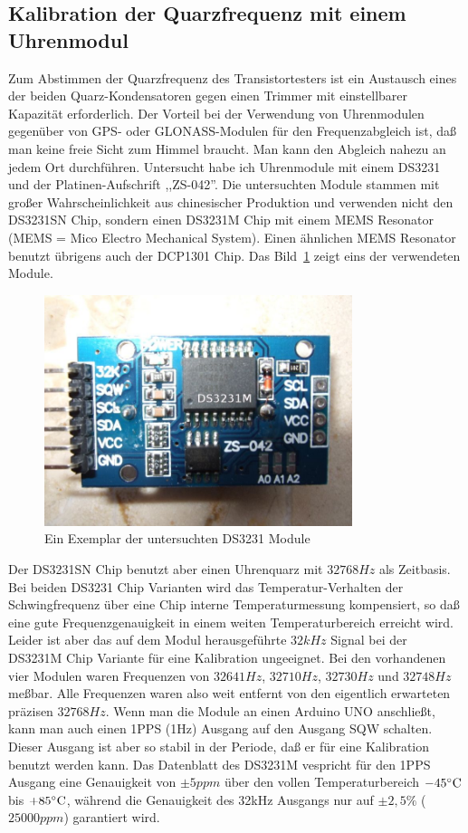 \subsection{Kalibration der Quarzfrequenz mit einem Uhrenmodul}

Zum Abstimmen der Quarzfrequenz des Transistortesters ist ein Austausch eines der beiden Quarz-Kondensatoren 
gegen einen Trimmer mit einstellbarer Kapazität erforderlich.
Der Vorteil bei der Verwendung von Uhrenmodulen gegenüber von GPS- oder GLONASS-Modulen für den Frequenzabgleich ist,
daß man keine freie Sicht zum Himmel braucht. Man kann den Abgleich nahezu an jedem Ort durchführen.
Untersucht habe ich Uhrenmodule mit einem DS3231 und der Platinen-Aufschrift ,,ZS-042''.
Die untersuchten Module stammen mit großer Wahrscheinlichkeit aus chinesischer Produktion und verwenden
nicht den DS3231SN Chip, sondern einen DS3231M Chip mit einem MEMS Resonator (MEMS = Mico Electro Mechanical System). 
Einen ähnlichen MEMS Resonator benutzt übrigens auch der DCP1301 Chip.
Das Bild~\ref{fig:DS3231M} zeigt eins der verwendeten Module.

\begin{figure}[H]
\centering
\includegraphics[width=9cm]{../PNG/DS3231M.jpg}
\caption{Ein Exemplar der untersuchten DS3231 Module}
\label{fig:DS3231M}
\end{figure}

Der DS3231SN Chip benutzt aber einen Uhrenquarz mit \(32768Hz\) als Zeitbasis.
Bei beiden DS3231 Chip Varianten wird das Temperatur-Verhalten der Schwingfrequenz über eine Chip interne Temperaturmessung
kompensiert, so daß eine gute Frequenzgenauigkeit in einem weiten Temperaturbereich erreicht wird.
Leider ist aber das auf dem Modul herausgeführte \(32kHz\) Signal bei der DS3231M Chip Variante für eine
Kalibration ungeeignet. Bei den vorhandenen vier Modulen waren Frequenzen von \(32641Hz\), \(32710Hz\), \(32730Hz\) und \(32748Hz\) meßbar.
Alle Frequenzen waren also weit entfernt von den eigentlich erwarteten präzisen \(32768Hz\).
Wenn man die Module an einen Arduino UNO anschließt, kann man auch einen 1PPS (1Hz) Ausgang auf den Ausgang SQW schalten.
Dieser Ausgang ist aber so stabil in der Periode, daß er für eine Kalibration benutzt werden kann.
Das Datenblatt des DS3231M vespricht für den 1PPS Ausgang eine Genauigkeit von \(\pm 5ppm\) über den vollen Temperaturbereich
\(-45\celsius\)  bis \(+85\celsius\), während die Genauigkeit des 32kHz Ausgangs nur auf \(\pm 2,5\%\) (\(25000ppm\)) garantiert wird.



